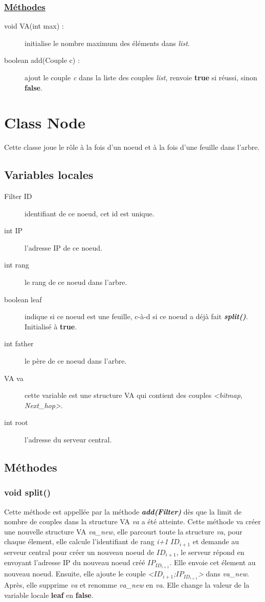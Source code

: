 \documentclass[a4paper,11pt]{report}
\begin{document}
\subsubsection{\underline{Méthodes}}
	\begin{description}
		\item[void VA(int max) :] initialise le nombre maximum des éléments dans \textit{list}.
		\item[boolean add(Couple c) :] ajout le couple \textit{c} dans la liste des couples \textit{list}, renvoie \textbf{true} si réussi, sinon \textbf{false}. 
	\end{description}
	
\section{Class Node}
	Cette classe joue le rôle à la fois d'un noeud et à la fois d'une feuille dans l'arbre.
	
\subsection{Variables locales}
	\begin{description}
		\item[Filter ID] identifiant de ce noeud, cet id est unique.
		\item[int IP] l'adresse IP de ce noeud.
		\item[int rang] le rang de ce noeud dans l'arbre.
		\item[boolean leaf] indique si ce noeud est une feuille, c-à-d si ce noeud a déjà fait \textbf{\textit{split()}}. Initialisé à \textbf{true}.
		\item[int father] le père de ce noeud dans l'arbre.
		\item[VA va] cette variable est une structure VA qui contient des couples \textit{<bitmap, Next\_hop>}.
		\item[int root] l'adresse du serveur central.
	\end{description}
	
\subsection{Méthodes}
\subsubsection{void split()}
	Cette méthode est appellée par la méthode \textbf{\textit{add(Filter)}} dès que la limit de nombre de couples dans la structure VA \textit{va} a été atteinte. Cette méthode va créer une nouvelle structure VA \textit{va\_new}, elle parcourt toute la structure \textit{va}, pour chaque élement, elle calcule l'identifiant de rang \textit{i+1} $ID_{i+1}$ et demande au serveur central pour créer un nouveau noeud de $ID_{i+1}$, le serveur répond en envoyant l'adresse IP du nouveau noeud créé $IP_{ID_{i+1}}$. Elle envoie cet élement au nouveau noeud. Ensuite, elle ajoute le couple \textit{<$ID_{i+1}$;$IP_{ID_{i+1}}$>} dans \textit{va\_new}. Après, elle supprime \textit{va} et renomme \textit{va\_new} en \textit{va}. Elle change la valeur de la variable locale \textbf{leaf} en \textbf{false}.
\end{document}
